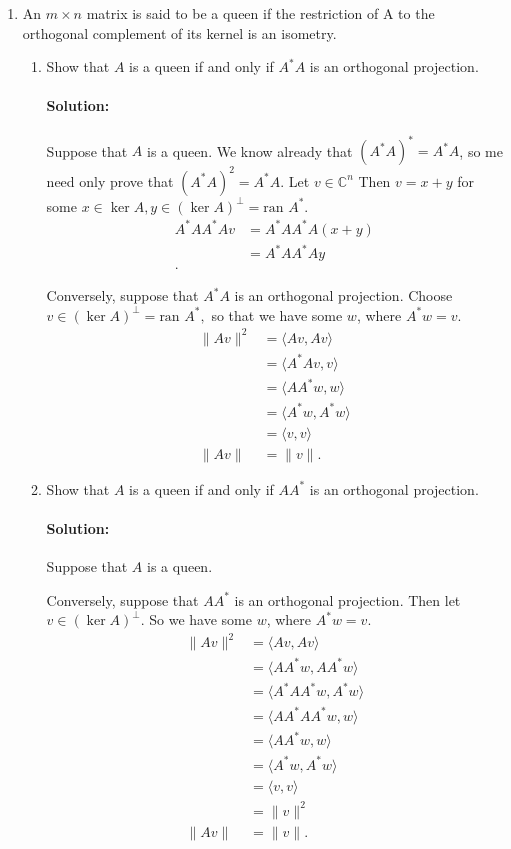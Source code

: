 \documentclass{article}
\begin{document}
\begin{enumerate} 

\item An $m \times n$ matrix is said to be a queen if the restriction of A to the orthogonal complement of its kernel is an isometry.

\begin{enumerate}[label= (\alph*)] 
\item Show that $A$ is a queen if and only if $A^* A$ is an orthogonal projection.
    \paragraph{Solution: }
Suppose that $A$ is a queen. We know already that $(A^* A)^* =A^* A$, so me need only prove that $(A^* A)^2=A^* A$. Let $v\in \mathbb{C}^{n}$ Then $v=x+y$ for some $x\in \ker A,y\in (\ker A)^{\perp}=\text{ran }A^* $.
    \begin{align*}
        A^* A A^* A v &=A^* A A^* A (x+y)\\
        &=A^* A A^* A y\\
    .\end{align*}%

    Conversely, suppose that $A^* A$ is an orthogonal projection. Choose $v\in (\ker A)^{\perp}=\text{ran }A^{*},$ so that we have some $w$, where  $A^* w=v$.
    \begin{align*}
        \|Av\|^2&= \langle Av,Av \rangle \\
        &= \langle A^* Av,v \rangle \\
        &= \langle A A^* w,w \rangle \\
        &= \langle A^* w,A^* w \rangle \\
        &= \langle v,v \rangle \\
        \|Av\|&=\|v\|
    .\end{align*}
\item Show that $A$ is a queen if and only if $AA^*$ is an orthogonal projection.
    \paragraph{Solution: }Suppose that $A$ is a queen. %

    Conversely, suppose that $AA^*$ is an orthogonal projection. Then let $v\in (\ker A)^{\perp}$. So we have some $w$, where  $A^* w=v$.
    \begin{align*}
        \|Av\|^2&= \langle Av,Av \rangle \\
        &= \langle A A^* w,A A^* w \rangle \\
        &= \langle A^* A A^* w, A^* w \rangle \\
        &= \langle AA^* A A^* w,  w \rangle \\
        &= \langle  A A^* w,  w \rangle \\
        &= \langle   A^* w,  A^* w \rangle \\
        &= \langle   v, v \rangle \\
        &= \|v\|^2\\
        \|Av\|&=\|v\|
    .\end{align*}


\end{enumerate}
\end{enumerate}
\end{document}
